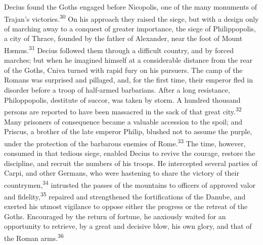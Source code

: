 
Decius found the Goths engaged before Nicopolis, one of the many
monuments of Trajan’s victories.\textsuperscript{30} On his approach they raised
the siege, but with a design only of marching away to a conquest
of greater importance, the siege of Philippopolis, a city of
Thrace, founded by the father of Alexander, near the foot of
Mount Hæmus.\textsuperscript{31} Decius followed them through a difficult country,
and by forced marches; but when he imagined himself at a
considerable distance from the rear of the Goths, Cniva turned
with rapid fury on his pursuers. The camp of the Romans was
surprised and pillaged, and, for the first time, their emperor
fled in disorder before a troop of half-armed barbarians. After a
long resistance, Philoppopolis, destitute of succor, was taken by
storm. A hundred thousand persons are reported to have been
massacred in the sack of that great city.\textsuperscript{32} Many prisoners of
consequence became a valuable accession to the spoil; and
Priscus, a brother of the late emperor Philip, blushed not to
assume the purple, under the protection of the barbarous enemies
of Rome.\textsuperscript{33} The time, however, consumed in that tedious siege,
enabled Decius to revive the courage, restore the discipline, and
recruit the numbers of his troops. He intercepted several parties
of Carpi, and other Germans, who were hastening to share the
victory of their countrymen,\textsuperscript{34} intrusted the passes of the
mountains to officers of approved valor and fidelity,\textsuperscript{35} repaired
and strengthened the fortifications of the Danube, and exerted
his utmost vigilance to oppose either the progress or the retreat
of the Goths. Encouraged by the return of fortune, he anxiously
waited for an opportunity to retrieve, by a great and decisive
blow, his own glory, and that of the Roman arms.\textsuperscript{36}


